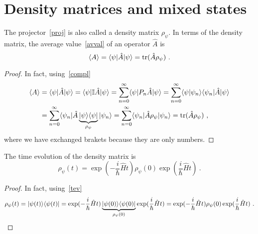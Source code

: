 \section{Density matrices and mixed states}

    The projector~\eqref{proj} is also called a density matrix $\rho_\psi$. In terms of the density matrix, the average value~\eqref{avval} of an operator $\hat A$ is 
    \begin{equation*}
        \langle A\rangle = \langle\psi\vert \hat A \vert\psi\rangle = \operatorname{tr} (\hat A \rho_\psi) ~.
    \end{equation*}
    \begin{proof}
        In fact, using~\eqref{compl}
        \begin{equation*}
        \begin{aligned}
            \langle A\rangle & = \langle\psi\vert \hat A \vert\psi\rangle = \langle\psi\vert \mathbb I \hat A \vert\psi\rangle = \sum_{n=0}^{\infty} \langle\psi\vert P_n \hat A \vert\psi\rangle = \sum_{n=0}^{\infty} \langle\psi\vert\psi_n\rangle \langle\psi_n\vert \hat A \vert\psi\rangle \\ & = \sum_{n=0}^{\infty} \langle\psi_n\vert \hat A \underbrace{\vert\psi\rangle \langle\psi\vert}_{\rho_\psi} \vert\psi_n\rangle = \sum_{n=0}^{\infty} \langle\psi_n\vert \hat A \rho_\psi \vert\psi_n\rangle = \operatorname{tr} (\hat A \rho_\psi) ~,
        \end{aligned}
        \end{equation*}
        where we have exchanged brakets because they are only numbers.
    \end{proof}
    The time evolution of the density matrix is 
    \begin{equation*}
        \rho_\psi (t) = \exp(- \frac{i}{\hbar} \hat H t) \rho_\psi (0) \exp(\frac{i}{\hbar} \hat H t) ~.
    \end{equation*}
    \begin{proof}
        In fact, using~\eqref{tev}
        \begin{equation*}
            \rho_\psi (t) = \vert\psi(t)\rangle \langle\psi(t)\vert = \exp(- \frac{i}{\hbar} \hat H t) \underbrace{\vert\psi(0)\rangle \langle\psi(0)\vert}_{\rho_\psi (0)} \exp(\frac{i}{\hbar} \hat H t) = \exp(- \frac{i}{\hbar} \hat H t) \rho_\psi (0) \exp(\frac{i}{\hbar} \hat H t) ~.
        \end{equation*}
    \end{proof}

